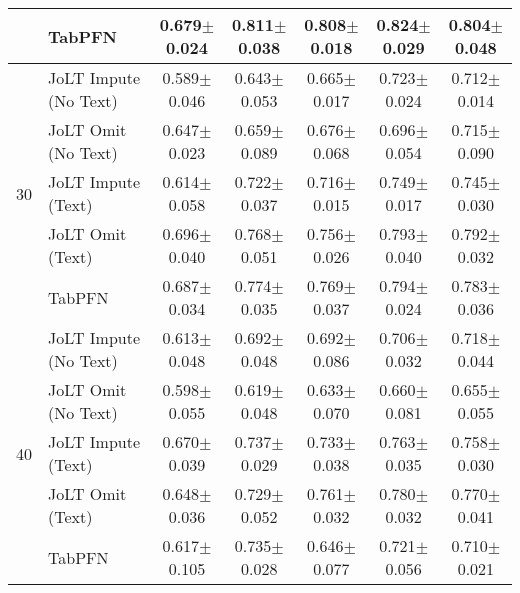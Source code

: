 \begin{table*}[htbp]
\begin{small}
\begin{sc}
\begin{adjustbox}{max width=\textwidth}
\begin{tabular}{clccccc}
          & TabPFN & 0.679$\pm$0.024 & 0.811$\pm$0.038 & 0.808$\pm$0.018 & 0.824$\pm$0.029 & 0.804$\pm$0.048 \\
    \midrule
          & JoLT Impute (No Text) & 0.589$\pm$0.046 & 0.643$\pm$0.053 & 0.665$\pm$0.017 & 0.723$\pm$0.024 & 0.712$\pm$0.014 \\
          & JoLT Omit (No Text) & 0.647$\pm$0.023 & 0.659$\pm$0.089 & 0.676$\pm$0.068 & 0.696$\pm$0.054 & 0.715$\pm$0.090 \\
    30    & JoLT Impute (Text) & 0.614$\pm$0.058 & 0.722$\pm$0.037 & 0.716$\pm$0.015 & 0.749$\pm$0.017 & 0.745$\pm$0.030 \\
          & JoLT Omit (Text) & 0.696$\pm$0.040 & 0.768$\pm$0.051 & 0.756$\pm$0.026 & 0.793$\pm$0.040 & 0.792$\pm$0.032 \\
          & TabPFN & 0.687$\pm$0.034 & 0.774$\pm$0.035 & 0.769$\pm$0.037 & 0.794$\pm$0.024 & 0.783$\pm$0.036 \\
    \midrule
          & JoLT Impute (No Text) & 0.613$\pm$0.048 & 0.692$\pm$0.048 & 0.692$\pm$0.086 & 0.706$\pm$0.032 & 0.718$\pm$0.044 \\
          & JoLT Omit (No Text) & 0.598$\pm$0.055 & 0.619$\pm$0.048 & 0.633$\pm$0.070 & 0.660$\pm$0.081 & 0.655$\pm$0.055 \\
    40    & JoLT Impute (Text) & 0.670$\pm$0.039 & 0.737$\pm$0.029 & 0.733$\pm$0.038 & 0.763$\pm$0.035 & 0.758$\pm$0.030 \\
          & JoLT Omit (Text) & 0.648$\pm$0.036 & 0.729$\pm$0.052 & 0.761$\pm$0.032 & 0.780$\pm$0.032 & 0.770$\pm$0.041 \\
          & TabPFN & 0.617$\pm$0.105 & 0.735$\pm$0.028 & 0.646$\pm$0.077 & 0.721$\pm$0.056 & 0.710$\pm$0.021 \\
    \bottomrule
    \end{tabular}%
    \end{adjustbox}
  \end{sc}
  \end{small}
  \vskip -0.1in
\end{table*}%

